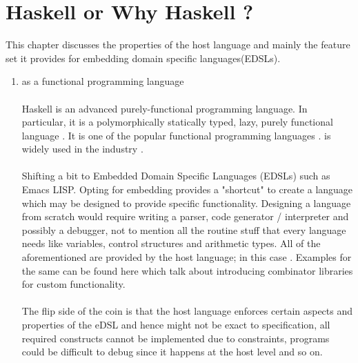 \documentclass[proposal.tex]{subfiles}
\begin{document}
\section{Haskell or Why Haskell ?}\label{sect:hwh}

\par This chapter discusses the properties of the host language  and mainly the feature set it provides for embedding 
domain specific languages(EDSLs).

\begin{enumerate}

\item {} as a functional programming language
\paragraph{}
Haskell is an advanced purely-functional programming language. In particular, it is a polymorphically statically typed, lazy, purely 
functional language \cite{website:haskellwiki}. It is one of the popular functional programming languages \cite{website:langpop}. 
 is widely used in the industry \cite{website:haskellinindustry}. 

\paragraph{}
Shifting a bit to Embedded Domain Specific Languages (EDSLs) such as Emacs LISP. Opting for embedding provides a "shortcut" to create a 
language which may be designed to provide specific functionality. Designing a language from scratch would require writing a parser, code 
generator / interpreter and possibly a debugger, not to mention all the routine stuff that every language needs like variables, control 
structures and arithmetic types. All of the aforementioned are provided by the host language; in this case . Examples for 
the same can be found here \cite{jones2001composing, meyer2008eiffel} which talk about introducing combinator libraries for custom 
functionality.

\paragraph{}
The flip side of the coin is that the host language enforces certain aspects and properties of the eDSL and hence might not be exact to 
specification, all required constructs cannot be implemented due to constraints, programs could be difficult to debug since it happens at
the host level and so on.


\end{enumerate}
\end{document}
